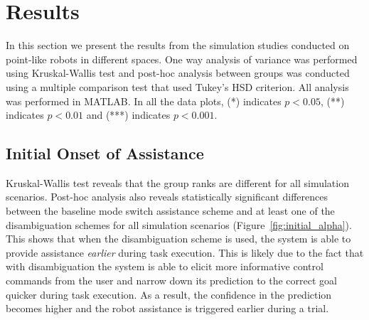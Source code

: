 \documentclass[conference]{IEEEtran}
\begin{document}
\section{Results}\label{sec:results}

In this section we present the results from the simulation studies conducted on point-like robots in different spaces. One way analysis of variance was performed using Kruskal-Wallis test and post-hoc analysis between groups was conducted using a multiple comparison test that used Tukey's HSD criterion. All analysis was performed in MATLAB. In all the data plots, (*) indicates $p < 0.05$, (**) indicates $p < 0.01$ and (***) indicates $p < 0.001$.
\subsection{Initial Onset of Assistance}

Kruskal-Wallis test reveals that the group ranks are different for all simulation scenarios. Post-hoc analysis also reveals statistically significant differences between the baseline mode switch assistance scheme and at least one of the disambiguation schemes for all simulation scenarios (Figure~\ref{fig:initial_alpha}). This shows that when the disambiguation scheme is used, the system is able to provide assistance \textit{earlier} during task execution. This is likely due to the fact that with disambiguation the system is able to elicit more informative control commands from the user and narrow down its prediction to the correct goal quicker during task execution. As a result, the confidence in the prediction becomes higher and the robot assistance is triggered earlier during a trial. 
\end{document}
